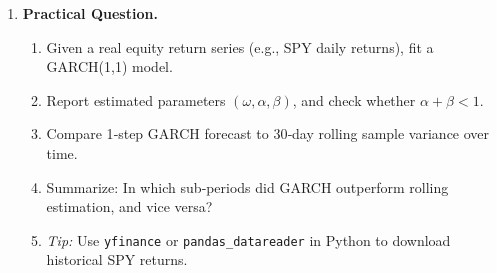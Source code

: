 \documentclass[11pt]{amsart}
\begin{document}
\begin{enumerate}[label=\arabic*.,noitemsep,left=0pt]
  \item \textbf{Practical Question.}\\
    \begin{enumerate}[noitemsep,left=1em]
      \item Given a real equity return series (e.g., SPY daily returns), fit a GARCH(1,1) model.
      \item Report estimated parameters $(\omega,\alpha,\beta)$, and check whether $\alpha + \beta < 1$.
      \item Compare 1‐step GARCH forecast to 30‐day rolling sample variance over time.
      \item Summarize: In which sub‐periods did GARCH outperform rolling estimation, and vice versa?
      \item \emph{Tip:} Use \texttt{yfinance} or \texttt{pandas\_datareader} in Python to download historical SPY returns.
    \end{enumerate}
\end{enumerate}

\end{document}

